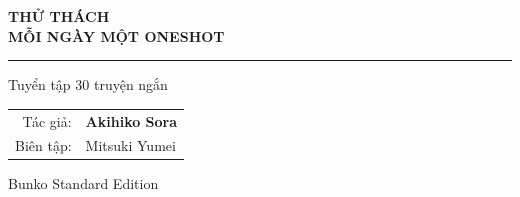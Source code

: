 
\thispagestyle{empty}
\vspace*{2cm}

\begin{center}
    {\titlefont\LARGE
        \textbf{THỬ THÁCH}\\[0.4cm]
        \textbf{MỖI NGÀY MỘT ONESHOT}
    }
    
    \vspace{1cm}
    \textcolor{bunko_gray}{\rule{3cm}{0.5pt}}
    \vspace{1cm}
    
    {\large Tuyển tập 30 truyện ngắn}
    
    \vfill
    
    \begin{tabular}{rl}
        \textcolor{bunko_gray}{\small Tác giả:} & \textbf{Akihiko Sora} \\[0.3cm]
        \textcolor{bunko_gray}{\small Biên tập:} & Mitsuki Yumei \\
    \end{tabular}
    
    \vspace{2cm}
    
    {\small\textcolor{bunko_gray}{Bunko Standard Edition}}
    \vspace{1cm}
\end{center}

\clearpage